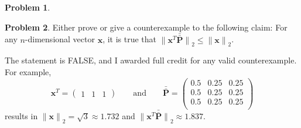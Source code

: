 \documentclass[10pt]{exam}
\newcommand*{\hl}[1]{\colorbox{yellow}{#1}}
\newcommand*{\TrueFalse}[1]{%
\ifprintanswers
    \ifthenelse{\equal{#1}{T}}{%
        \hl{\texttt{True}}\hspace*{20pt}\texttt{False}\hspace*{20pt}\texttt{Open}
    }{
        \ifthenelse{\equal{#1}{F}}{
        \texttt{True}\hspace*{20pt}\hl{\texttt{False}}\hspace*{20pt}\texttt{Open}
        }
        {
            \texttt{True}\hspace*{20pt}{\texttt{False}}\hspace*{20pt}\hl{\texttt{Open}}
        }
    }
\else
    \texttt{True}\hspace*{20pt}\texttt{False}\hspace*{20pt}\texttt{Open}
\fi
}
\newlength\TFlengthA
\newlength\TFlengthB
\newcommand\TFQuestion[2]{%
    \setlength\TFlengthB{\linewidth}
    \addtolength\TFlengthB{-\TFlengthA}
    \noindent
    \parbox[t]{\TFlengthA}{\TrueFalse{#1}}\parbox[t]{\TFlengthB}{#2}
    \vspace{0.25in}
}
\theoremstyle{definition}
\newtheorem{problem}{Problem}
\newcommand{\p}{\mathbf P}
\newcommand{\pb}{\bar {\p}}
\newcommand{\pbb}{\bar {\pb}}
\newcommand{\trans}[1]{{#1}^{T}}
\newcommand{\x}{\mathbf x}
\newcommand{\ltwo}[1]{{\lVert {#1} \rVert}_2}
\begin{document}
\begin{problem}
\begin{enumerate}
\end{enumerate}
\end{problem}

\newpage
\begin{problem}
Either prove or give a counterexample to the following claim: For any $n$-dimensional vector $\x$, it is true that $\ltwo{\trans\x\pbb} \le \ltwo{\x}$.
\end{problem}
\begin{solution}
    The statement is FALSE, and I awarded full credit for any valid counterexample.
    For example,
    \begin{equation}
        \trans\x = 
        \begin{pmatrix}
            1 & 1 & 1
        \end{pmatrix}
        \qquad\text{and}\qquad \pbb=
        \begin{pmatrix}
            0.5 & 0.25 & 0.25 \\
            0.5 & 0.25 & 0.25 \\
            0.5 & 0.25 & 0.25 \\
        \end{pmatrix}
    \end{equation}
    results in $\ltwo{\x} = \sqrt{3} \approx 1.732$ and $\ltwo{\trans\x\pbb} \approx 1.837$.
\end{solution}
\end{document}
